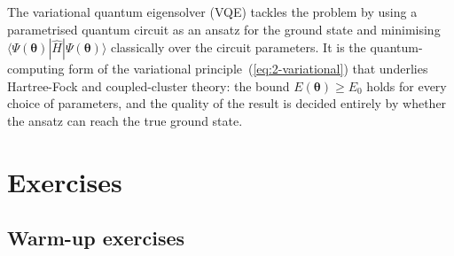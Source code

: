 The variational quantum eigensolver (VQE) tackles the problem by using a
parametrised quantum circuit as an ansatz for the ground state and minimising
$\langle\Psi(\bm{\theta})|\hat{H}|\Psi(\bm{\theta})\rangle$ classically over
the circuit parameters.  It is the quantum-computing form of the variational
principle~(\ref{eq:2-variational}) that underlies Hartree-Fock and
coupled-cluster theory: the bound $E(\bm{\theta})\ge E_0$ holds for every
choice of parameters, and the quality of the result is decided entirely by
whether the ansatz can reach the true ground state.

\section{Exercises}


\subsection*{Warm-up exercises}


